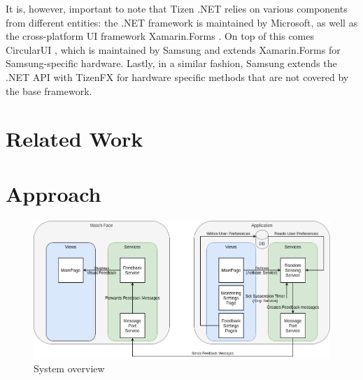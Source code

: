 \documentclass[conference, a4paper, 10pt, twocolumn]{IEEEtran}
\begin{document}
It is, however, important to note that Tizen .NET relies on various components from different entities: the .NET framework \cite{dotnet} is maintained by Microsoft, as well as the cross-platform UI framework Xamarin.Forms \cite{xamarin}. On top of this comes CircularUI \cite{circularUI}, which is maintained by Samsung and extends Xamarin.Forms for Samsung-specific hardware. Lastly, in a similar fashion, Samsung extends the .NET \ac{API} with TizenFX\cite{tizenFX} for hardware specific methods that are not covered by the base framework.

\section{Related Work}\label{related}

\section{Approach}\label{approach}

\begin{figure}[ht]
\centerline{\includegraphics[width=1\textwidth]{img/appDiagram.png}}
\caption{System overview}
\label{systemOverview}
\end{figure}
\end{document}
